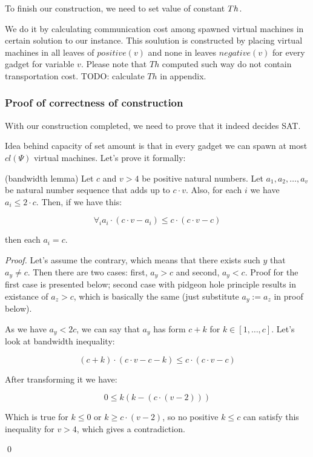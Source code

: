 To finish our construction, we need to set value of constant $Th$. 

 We
do it by calculating communication cost among spawned virtual machines in
certain solution to our instance. This soulution is constructed by placing
virtual machines in all leaves of $positive(v)$ and none in leaves
$negative(v)$ for every gadget for variable $v$. Please note that $Th$
computed such way do not contain transportation cost. TODO: calculate
$Th$ in appendix.

\subsubsection{Proof of correctness of construction}

With our construction completed, we need to prove that it indeed
decides SAT.

Idea behind capacity of set amount is that in every gadget we can
spawn at most $cl(\Psi)$ virtual machines. Let's prove it formally:

\begin{lemma} (bandwidth lemma)
  Let $c$ and $v > 4$ be positive natural numbers. Let $a_1, a_2, \ldots,
  a_v$ be natural number sequence that adds up to $c \cdot v$. Also, for
  each $i$ we have $a_i \leq 2 \cdot c$. Then, if we have this:

  $$ \forall_i a_i \cdot (c \cdot v - a_i) \leq c \cdot (c \cdot v -
  c) $$

  then each $a_i = c$.
\end{lemma}
\begin{proof}

Let's assume the contrary, which means that there exists such $y$ that
$a_y \neq c$. Then there are two cases: first, $a_y>c$ and second,
$a_y<c$. Proof for the first case is presented below; second case
with pidgeon hole principle results in existance of $a_z > c$, which
is basically the same (just substitute $a_y := a_z$ in proof below).

As we have $a_y < 2c$, we can say that $a_y$ has form $c +
k$ for $k \in [1, \ldots, c]$. Let's look at bandwidth inequality:

$$ (c + k) \cdot (c \cdot v - c - k) \leq c \cdot (c \cdot v - c) $$

After transforming it we have:

$$ 0 \leq k(k - (c \cdot (v - 2))) $$

Which is true for $k \leq 0$ or $k \geq c \cdot (v - 2)$, so no
positive $k \leq c$ can satisfy this inequality for $v > 4$, which gives a contradiction. 

\qed

\end{proof}

